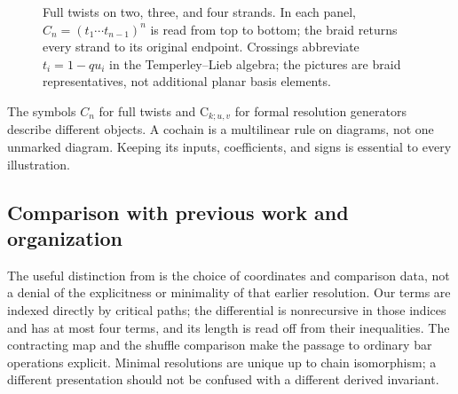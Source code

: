 \documentclass[a4paper,11pt,oneside,reqno]{amsart}
\theoremstyle{definition}
\numberwithin{equation}{section}
\begin{document}
\begin{figure}[htbp]
\caption{Full twists on two, three, and four strands. In each panel,
$C_n=(t_1\cdots t_{n-1})^n$ is read from top to bottom; the braid
returns every strand to its original endpoint. Crossings abbreviate
$t_i=1-qu_i$ in the Temperley--Lieb algebra; the pictures are braid
representatives, not additional planar basis elements.}
\label{fig:intro-full-twists}
\end{figure}

The symbols $C_n$ for full twists and $\mathrm C_{k;u,v}$ for formal
resolution generators describe different objects. A cochain is a
multilinear rule on diagrams, not one unmarked diagram. Keeping its
inputs, coefficients, and signs is essential to every illustration.

\subsection{Comparison with previous work and organization}
The useful distinction from \cite{LiXuChen} is the choice of coordinates
and comparison data, not a denial of the explicitness or minimality of
that earlier resolution. Our terms are indexed directly by critical
paths; the differential is nonrecursive in those indices and has at
most four terms, and its length is read off from their inequalities.
The contracting map and the shuffle comparison make the passage to
ordinary bar operations explicit. Minimal resolutions are unique up
to chain isomorphism; a different presentation should not be confused
with a different derived invariant.
\end{document}
